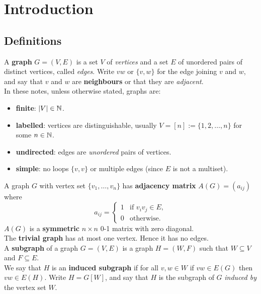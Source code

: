 \chapter{Introduction}

\section{Definitions}

A \textbf{graph} \(G = (V, E)\) is a set \(V\) of \textit{vertices} and a set \(E\) of unordered pairs of distinct vertices, called \textit{edges}. Write \(vw\) or \(\{v, w\}\) for the edge joining \(v\) and \(w\), and say that \(v\) and \(w\) are \textbf{neighbours} or that they are \textit{adjacent}. \\

In these notes, unless otherwise stated, graphs are:
\begin{itemize}
    \item \textbf{finite}: \(|V| \in \mathbb{N}\).
    \item \textbf{labelled}: vertices are distinguishable, usually \(V = [n] := \{1, 2, \dots, n\}\) for some \(n \in \mathbb{N}\).
    \item \textbf{undirected}: edges are \textit{unordered} pairs of vertices.
    \item \textbf{simple}: no loops \(\{v, v\}\) or multiple edges (since \(E\) is not a multiset).
\end{itemize}

A graph \(G\) with vertex set \(\{v_1, \dots, v_n\}\) has \textbf{adjacency matrix} \(A(G) = (a_{ij})\) where
\[a_{ij} =
    \begin{cases}
        1 & \text{if } v_i v_j \in E, \\
        0 & \text{otherwise}.
    \end{cases}
\]
\(A(G)\) is a \textbf{symmetric} \(n \times n\) 0-1 matrix with zero diagonal. \\

The \textbf{trivial graph} has at most one vertex. Hence it has no edges. \\

A \textbf{subgraph} of a graph \(G = (V, E)\) is a graph \(H = (W, F)\) such that \(W \subseteq V\) and \(F \subseteq E\). \\

We say that \(H\) is an \textbf{induced subgraph} if for all \(v, w \in W\) if \(vw \in E(G)\) then \(vw \in E(H)\). Write \(H = G[W]\), and say that \(H\) is the subgraph of \(G\) \textit{induced by} the vertex set \(W\).

